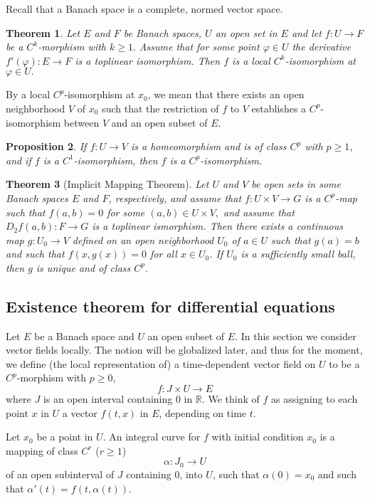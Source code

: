\documentclass[a5paper,10pt,twoside]{article}
\newcommand{\R}{\ensuremath{\mathbb{R}}}
\theoremstyle{plain}
\newtheorem{teo}{Theorem}[section]
\newtheorem{prop}[teo]{Proposition}
\theoremstyle{definition}
\theoremstyle{remark}
\begin{document}
Recall that a Banach space is a complete, normed vector space.

\begin{teo}
	\label{teo:Cpmorphism}
	Let $E$ and $F$ be Banach spaces, $U$ an open set in $E$ and let
	$f:U\to F$ be a $C^{k}$-morphism with $k\geq1.$ Assume that for
	some point $\varphi\in U$ the derivative $f'(\varphi):E\to F$ is
	a toplinear isomorphism. Then $f$ is a local $C^{k}$-isomorphism
	at $\varphi\in U.$
\end{teo}

By a local $C^p$-isomorphism at $x_0$, we mean that there exists an open
neighborhood $V$ of $x_0$ such that the restriction of $f$ to $V$ establishes a
$C^p$-isomorphism between $V$ and an open subset of $E.$

\begin{prop}
	If $f: U\to V$ is a homeomorphism and is of class $C^p$ with $p\geq1$, and if $f$ is a $C^1$-isomorphism, then $f$ is a $C^p$-isomorphism.
\end{prop}


\begin{teo}[Implicit Mapping Theorem]
	Let $U$ and $V$ be open sets in some Banach spaces $E$ and $F$, respectively, and assume that $f:U\times V\to G$ is a $C^p$-map such that $f(a,b)=0$ for some $(a,b)\in U\times V,$ and assume that $D_2f(a,b): F\to G$ is a toplinear ismorphism. Then there exists a continuous map $g: U_0\to V$ defined on an open neighborhood $U_0$ of $a\in U$ such that $g(a) = b$ and such that $f(x,g(x))=0$ for all $x\in U_0$. If $U_0$ is a sufficiently small ball, then $g$ is unique and of class $C^p.$
\end{teo}


\subsection{Existence theorem for differential equations}
Let $E$ be a Banach space and $U$ an open subset of $E.$ In this section we consider vector fields locally. The notion will be globalized later, and thus for the moment, we define (the local representation of) a time-dependent vector field on $U$ to be a $C^p$-morphism with $p\geq 0,$
$$
f: J\times U\to E
$$
where $J$ is an open interval containing $0$ in $\R$. We think of $f$ as assigning to each point $x$ in $U$ a vector $f(t,x)$ in $E$, depending on time $t.$

Let $x_0$ be a point in $U$. An integral curve for $f$ with initial condition $x_0$ is a mapping of class $C^r$ ($r\geq 1$)
$$
\alpha: J_0\to U
$$
of an open subinterval of $J$ containing $0$, into $U$, such that $\alpha(0)=x_0$ and such that $\alpha'(t)=f(t,\alpha(t))$. 
\end{document}
